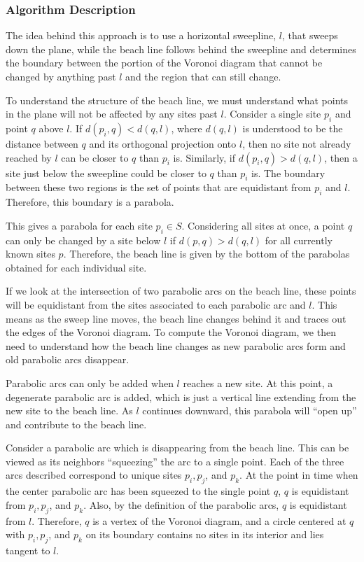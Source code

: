 \documentclass[a4paper, 11pt]{article}
\begin{document}
\subsubsection{Algorithm Description}
The idea behind this approach is to use a
horizontal sweepline, $l$, that sweeps down the plane, while the beach line follows behind the sweepline and determines the boundary between the portion of the Voronoi diagram that cannot be
changed by anything past $l$ and the region that can still change.

To understand the structure of the beach line, we must understand what points in the plane will not be affected by any sites past $l$.
Consider a single site $p_i$ and point $q$ above $l$. If $d(p_i,q) < d(q,l)$, where $d(q,l)$ is understood to be the distance between $q$ and its
orthogonal projection onto $l$, then
no site not already reached by $l$ can be closer to $q$ than $p_i$ is. Similarly, if $d(p_i,q) > d(q,l)$, then a site just
below the sweepline could be closer to $q$ than $p_i$ is. The boundary between these two regions is the set of points that are equidistant from $p_i$ and
$l$. Therefore, this boundary is a parabola.

This gives a parabola for each site $p_i \in S$. Considering all sites at once, a point $q$ can only be changed by a site below $l$ if $d(p,q) > d(q,l)$ for all
currently known sites $p$. Therefore, the beach line is given by the bottom of the parabolas obtained for each individual site.

If we look at the intersection of two parabolic arcs on the beach line, these points will be equidistant from the sites associated to each parabolic
arc and $l$. This means as the sweep line moves, the beach line changes behind it and traces out the edges of the Voronoi diagram. To compute the
Voronoi diagram, we then need to understand how the beach line changes as new parabolic arcs form and old parabolic arcs disappear.

Parabolic arcs can only be added when $l$ reaches a new site. At this point, a degenerate parabolic arc is added, which is just a vertical line
extending from the new site to the beach line. As $l$ continues downward, this parabola will ``open up'' and contribute to the beach line.

Consider a parabolic arc which is disappearing from the beach line. This can be viewed as its neighbors ``squeezing'' the arc to a single point. Each of the three arcs described correspond to unique sites $p_i, p_j$, and $p_k$.
At the point in time when the center parabolic arc has been squeezed to the single point $q$, $q$ is equidistant from
$p_i, p_j$, and $p_k$. Also, by the definition of the parabolic arcs, $q$ is equidistant from $l$. Therefore, $q$ is a
vertex of the Voronoi diagram, and a circle centered at $q$ with $p_i, p_j$, and $p_k$ on its boundary contains no sites in its interior and lies
tangent to $l$.
\end{document}
